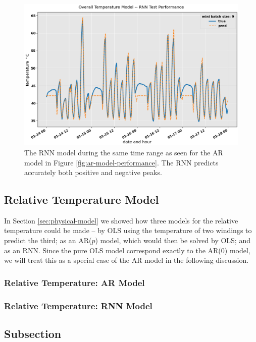 \documentclass[]{article}
\begin{document}
\begin{figure}[!h]
	\centering
	\includegraphics[width=1\linewidth]{./figs/rnn-model-performance.png}
	\caption{The RNN model during the same time range as seen for the AR model in Figure \ref{fig:ar-model-performance}. The RNN predicts accurately both positive and negative peaks.}
	\label{fig:rnn-model-performance}
\end{figure}

\subsection{Relative Temperature Model} \label{sec:results-relative}
In Section \ref{sec:physical-model} we showed how three models for the relative temperature could be made -- by OLS using the temperature of two windings to predict the third; as an AR($p$) model, which would then be solved by OLS; and as an RNN. Since the pure OLS model correspond exactly to the AR($0$) model, we will treat this as a special case of the AR model in the following discussion.

\subsubsection{Relative Temperature: AR Model} \label{sec:results-relative-ar}
\subsubsection{Relative Temperature: RNN Model} \label{sec:results-relative-rnn}

\subsection{Subsection} \label{sec:subsection-name}
\end{document}
